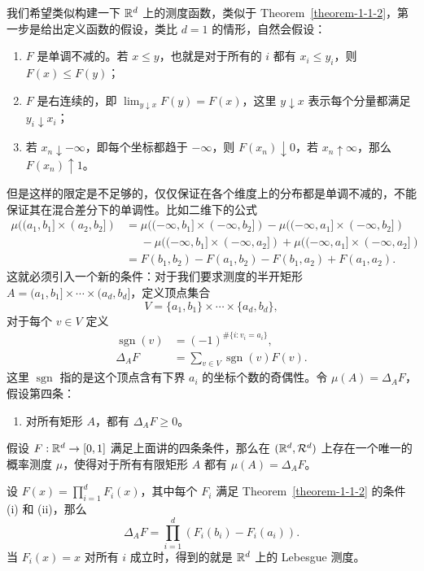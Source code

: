 我们希望类似构建一下 $\mathbb{R}^d$ 上的测度函数，类似于 Theorem~\ref{theorem-1-1-2}，第一步是给出定义函数的假设，类比 $d=1$ 的情形，自然会假设：
\begin{enumerate}
    \item $F$ 是单调不减的。若 $x \le y$，也就是对于所有的 $i$ 都有 $x_i \le y_i$，则 $F(x) \le F(y)$；
    \item $F$ 是右连续的，即 $\lim_{y \downarrow x} F(y) = F(x)$，这里 $y \downarrow x$ 表示每个分量都满足 $y_i \downarrow x_i$；
    \item 若 $x_n \downarrow -\infty$，即每个坐标都趋于 $-\infty$，则 $F(x_n) \downarrow 0$，若 $x_n \uparrow \infty$，那么 $F(x_n) \uparrow 1$。
\end{enumerate}
但是这样的限定是不足够的，仅仅保证在各个维度上的分布都是单调不减的，不能保证其在混合差分下的单调性。比如二维下的公式
\begin{align*}
    \mu((a_1,b_1] \times (a_2,b_2])
     & = \mu((-\infty,b_1] \times (-\infty,b_2])
    - \mu((-\infty,a_1] \times (-\infty,b_2])               \\
     & \phantom{={}}
    - \mu((-\infty,b_1] \times (-\infty,a_2])
    + \mu((-\infty,a_1] \times (-\infty,a_2])               \\
     & = F(b_1,b_2) - F(a_1,b_2) - F(b_1,a_2) + F(a_1,a_2).
\end{align*}
这就必须引入一个新的条件：对于我们要求测度的半开矩形 $A = (a_1,b_1] \times \cdots \times (a_d,b_d]$，定义顶点集合
\[
    V = \{a_1,b_1\} \times \cdots \times \{a_d,b_d\},
\]
对于每个 $v \in V$ 定义
\begin{align*}
    \operatorname{sgn}(v) & = (-1)^{\#\{i : v_i = a_i\}},                \\
    \Delta_A F            & = \sum_{v \in V} \operatorname{sgn}(v) F(v).
\end{align*}
这里 $\operatorname{sgn}$ 指的是这个顶点含有下界 $a_i$ 的坐标个数的奇偶性。令 $\mu(A) = \Delta_A F$，假设第四条：
\begin{enumerate}[resume]
    \item 对所有矩形 $A$，都有 $\Delta_A F \ge 0$。
\end{enumerate}

\begin{theorem}
    假设 $F : \mathbb{R}^d \to [0,1]$ 满足上面讲的四条条件，那么在 $(\mathbb{R}^d, \mathcal{R}^d)$ 上存在一个唯一的概率测度 $\mu$，使得对于所有有限矩形 $A$ 都有 $\mu(A) = \Delta_A F$。
\end{theorem}

\begin{example}\label{example-1-1-12}
    设 $F(x) = \prod_{i=1}^d F_i(x)$，其中每个 $F_i$ 满足 Theorem~\ref{theorem-1-1-2} 的条件 (i) 和 (ii)，那么
    \[
        \Delta_A F = \prod_{i=1}^d (F_i(b_i) - F_i(a_i)).
    \]
    当 $F_i(x) = x$ 对所有 $i$ 成立时，得到的就是 $\mathbb{R}^d$ 上的 Lebesgue 测度。
\end{example}

